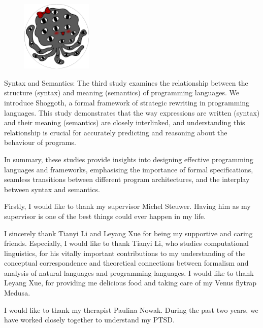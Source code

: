 \documentclass[phd,icsa,twoside,logo]{infthesis}
\begin{document}
\begin{preliminary}
\begin{laysummary}
\begin{figure}
  \vspace{-30pt}
  \begin{center}
    \includegraphics[width=0.3\textwidth]{Shoggoth.png}
  \end{center}
\end{figure}
Syntax and Semantics: The third study examines the relationship between the structure (syntax) and meaning (semantics) of programming languages. We introduce Shoggoth, a formal framework of strategic rewriting in programming languages. This study demonstrates that the way expressions are written (syntax) and their meaning (semantics) are closely interlinked, and understanding this relationship is crucial for accurately predicting and reasoning about the behaviour of programs.

In summary, these studies provide insights into designing effective programming languages and frameworks, emphasising the importance of formal specifications, seamless transitions between different program architectures, and the interplay between syntax and semantics.
\end{laysummary}


\begin{acknowledgements}
Firstly, I would like to thank my supervisor Michel Steuwer. Having him as my supervisor is one of the best things could ever happen in my life. 

I sincerely thank Tianyi Li and Leyang Xue for being my supportive and caring friends. Especially, I would like to thank Tianyi Li, who studies computational linguistics, for his vitally important contributions to my understanding of the conceptual correspondence and theoretical connections between formalism and analysis of natural languages and programming languages. I would like to thank Leyang Xue, for providing me delicious food and taking care of my Venus flytrap Medusa.

I would like to thank my therapist Paulina Nowak. During the past two years, we have worked closely together to understand my PTSD. 


\end{acknowledgements}
\end{preliminary}
\end{document}
